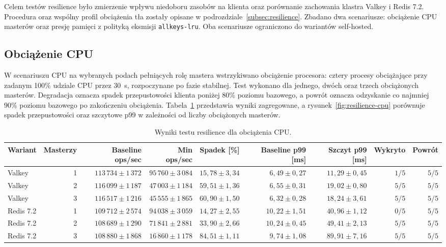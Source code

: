 Celem testów resilience było zmierzenie wpływu niedoboru zasobów na klienta oraz porównanie zachowania klastra Valkey i Redis 7.2. Procedura oraz wspólny profil obciążenia tła zostały opisane w podrozdziale~\ref{subsec:resilience}. Zbadano dwa scenariusze: obciążenie CPU masterów oraz presję pamięci z polityką eksmisji \texttt{allkeys-lru}. Oba scenariusze ograniczono do wariantów self-hosted.

\subsection{Obciążenie CPU}

W scenariuszu CPU na wybranych podach pełniących rolę mastera wstrzykiwano obciążenie procesora: cztery procesy obciążające przy zadanym 100\% udziale CPU przez 30~s, rozpoczynane po fazie stabilnej. Test wykonano dla jednego, dwóch oraz trzech obciążonych masterów. Degradacja oznacza spadek przepustowości klienta poniżej 80\% poziomu bazowego, a powrót oznacza odzyskanie co najmniej 90\% poziomu bazowego po zakończeniu obciążenia. Tabela~\ref{tab:resilience-cpu} przedstawia wyniki zagregowane, a rysunek~\ref{fig:resilience-cpu} porównuje spadek przepustowości oraz szczytowe p99 w zależności od liczby obciążonych masterów.

\begin{table}[htbp]
\centering
\caption{Wyniki testu resilience dla obciążenia CPU.}
\label{tab:resilience-cpu}
\begin{adjustbox}{max width=\textwidth}
\begin{tabular}{lrrrrrrrr}
\toprule
Wariant & Masterzy & Baseline ops/sec & Min ops/sec & Spadek [\%] & Baseline p99 [ms] & Szczyt p99 [ms] & Wykryto & Powrót \\
\midrule
Valkey & 1 & $113\,734 \pm 1\,372$ & $95\,760 \pm 3\,084$ & $15{,}78 \pm 3{,}34$ & $6{,}49 \pm 0{,}27$ & $11{,}29 \pm 0{,}45$ & $1/5$ & $5/5$ \\
Valkey & 2 & $116\,099 \pm 1\,187$ & $47\,003 \pm 1\,184$ & $59{,}51 \pm 1{,}36$ & $6{,}55 \pm 0{,}31$ & $19{,}02 \pm 0{,}80$ & $5/5$ & $5/5$ \\
Valkey & 3 & $116\,517 \pm 1\,216$ & $45\,555 \pm 1\,865$ & $60{,}90 \pm 1{,}50$ & $6{,}32 \pm 0{,}28$ & $18{,}24 \pm 3{,}61$ & $5/5$ & $5/5$ \\
Redis 7.2 & 1 & $109\,712 \pm 2\,574$ & $94\,038 \pm 3\,059$ & $14{,}27 \pm 2{,}55$ & $10{,}22 \pm 1{,}51$ & $40{,}96 \pm 1{,}12$ & $0/5$ & $5/5$ \\
Redis 7.2 & 2 & $108\,689 \pm 1\,290$ & $71\,841 \pm 2\,881$ & $33{,}90 \pm 2{,}66$ & $10{,}24 \pm 0{,}45$ & $49{,}41 \pm 2{,}13$ & $5/5$ & $5/5$ \\
Redis 7.2 & 3 & $108\,880 \pm 1\,868$ & $16\,860 \pm 1\,178$ & $84{,}51 \pm 1{,}11$ & $9{,}74 \pm 1{,}08$ & $89{,}91 \pm 7{,}16$ & $5/5$ & $5/5$ \\
\bottomrule
\end{tabular}
\end{adjustbox}
\end{table}

